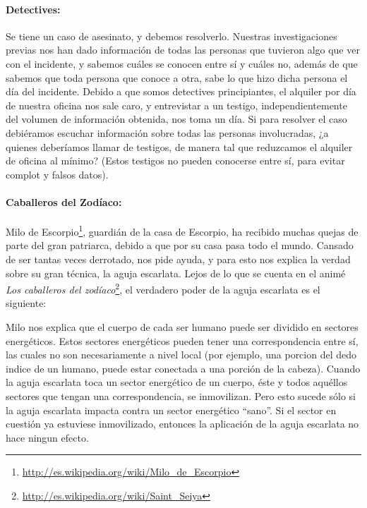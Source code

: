 \documentclass[a4paper]{article}
\begin{document}
\paragraph{Detectives:} Se tiene un caso de asesinato, y debemos resolverlo. Nuestras investigaciones previas nos han dado información de todas las personas que tuvieron algo que ver con el incidente, y sabemos cuáles se conocen entre sí y cuáles no, además de que sabemos que toda persona que conoce a otra, sabe lo que hizo dicha persona el día del incidente. Debido a que somos detectives principiantes, el alquiler por día de nuestra oficina nos sale caro, y entrevistar a un testigo, independientemente del volumen de información obtenida, nos toma un día. Si para resolver el caso debiéramos escuchar información sobre todas las personas involucradas, ¿a quienes deberíamos llamar de testigos, de manera tal que reduzcamos el alquiler de oficina al mínimo? (Estos testigos no pueden conocerse entre sí, para evitar complot y falsos datos).

\paragraph{Caballeros del Zodíaco:} Milo de Escorpio\footnote{\url{http://es.wikipedia.org/wiki/Milo_de_Escorpio}}, guardián de la casa de Escorpio, ha recibido muchas quejas de parte del gran patriarca, debido a que por su casa pasa todo el mundo. Cansado de ser tantas veces derrotado, nos pide ayuda, y para esto nos explica la verdad sobre su gran técnica, la aguja escarlata. Lejos de lo que se cuenta en el animé {\it Los caballeros del zodíaco}\footnote{\url{http://es.wikipedia.org/wiki/Saint_Seiya}}, el verdadero poder de la aguja escarlata es el siguiente:

Milo nos explica que el cuerpo de cada ser humano puede ser dividido en sectores energéticos.  Estos sectores energéticos pueden tener una correspondencia entre sí, las cuales no son necesariamente a nivel local (por ejemplo, una porcion del dedo indice de un humano, puede estar conectada a una porción de la cabeza). %
Cuando la aguja escarlata toca un sector energético de un cuerpo, éste y todos aquéllos sectores que tengan una correspondencia, se inmovilizan. Pero esto sucede sólo si la aguja escarlata impacta contra un sector energético ``sano''. Si el sector en cuestión ya estuviese inmovilizado, entonces la aplicación de la aguja escarlata no hace ningun efecto.
\end{document}
